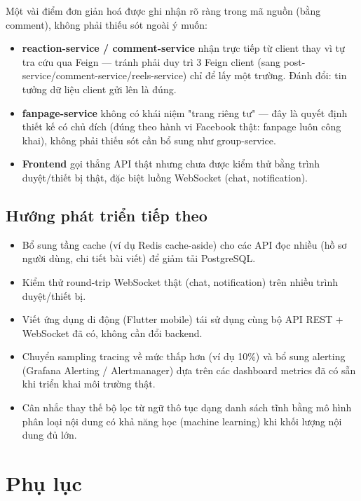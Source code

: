 \documentclass[12pt,a4paper]{report}
\begin{document}
Một vài điểm đơn giản hoá được ghi nhận rõ ràng trong mã nguồn (bằng comment),
không phải thiếu sót ngoài ý muốn:

\begin{itemize}[nosep]
    \item \textbf{reaction-service / comment-service} nhận 
    trực tiếp từ client thay vì tự tra cứu qua Feign — tránh phải duy trì 3
    Feign client (sang post-service/comment-service/reels-service) chỉ để lấy
    một trường. Đánh đổi: tin tưởng dữ liệu client gửi lên là đúng.
    \item \textbf{fanpage-service} không có khái niệm "trang riêng tư" — đây
    là quyết định thiết kế có chủ đích (đúng theo hành vi Facebook thật: fanpage
    luôn công khai), không phải thiếu sót cần bổ sung như group-service.
    \item \textbf{Frontend} gọi thẳng API thật nhưng chưa được kiểm thử bằng
    trình duyệt/thiết bị thật, đặc biệt luồng WebSocket (chat, notification).
\end{itemize}

\section{Hướng phát triển tiếp theo}

\begin{itemize}[nosep]
    \item Bổ sung tầng cache (ví dụ Redis cache-aside) cho các API đọc nhiều
    (hồ sơ người dùng, chi tiết bài viết) để giảm tải PostgreSQL.
    \item Kiểm thử round-trip WebSocket thật (chat, notification) trên nhiều
    trình duyệt/thiết bị.
    \item Viết ứng dụng di động (Flutter mobile) tái sử dụng cùng bộ API REST
    + WebSocket đã có, không cần đổi backend.
    \item Chuyển sampling tracing về mức thấp hơn (ví dụ 10\%) và bổ sung
    alerting (Grafana Alerting / Alertmanager) dựa trên các dashboard metrics
    đã có sẵn khi triển khai môi trường thật.
    \item Cân nhắc thay thế bộ lọc từ ngữ thô tục dạng danh sách tĩnh bằng mô
    hình phân loại nội dung có khả năng học (machine learning) khi khối lượng
    nội dung đủ lớn.
\end{itemize}

\appendix
\chapter{Phụ lục}
\end{document}
